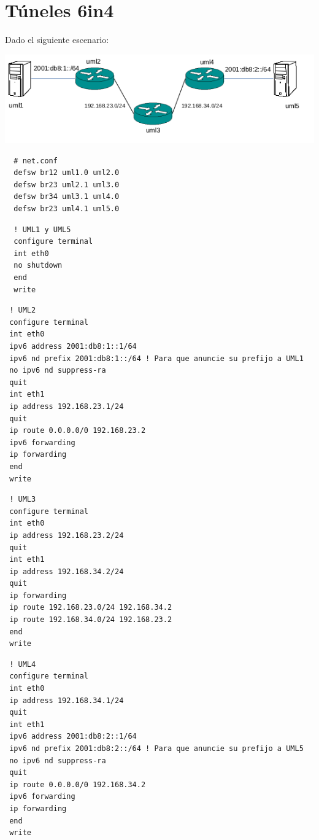 \documentclass{article}
\begin{document}
\tableofcontents

\section{Túneles 6in4}
Dado el siguiente escenario:

\includegraphics[width=\textwidth]{tuneles6in4}

\begin{verbatim}
  # net.conf
  defsw br12 uml1.0 uml2.0
  defsw br23 uml2.1 uml3.0
  defsw br34 uml3.1 uml4.0
  defsw br23 uml4.1 uml5.0
\end{verbatim}

\begin{verbatim}
  ! UML1 y UML5
  configure terminal
  int eth0
  no shutdown
  end
  write
\end{verbatim}

\begin{verbatim}
 ! UML2
 configure terminal
 int eth0
 ipv6 address 2001:db8:1::1/64
 ipv6 nd prefix 2001:db8:1::/64 ! Para que anuncie su prefijo a UML1
 no ipv6 nd suppress-ra
 quit
 int eth1
 ip address 192.168.23.1/24
 quit
 ip route 0.0.0.0/0 192.168.23.2
 ipv6 forwarding
 ip forwarding
 end
 write
\end{verbatim}

\begin{verbatim}
 ! UML3
 configure terminal
 int eth0
 ip address 192.168.23.2/24
 quit
 int eth1
 ip address 192.168.34.2/24
 quit
 ip forwarding
 ip route 192.168.23.0/24 192.168.34.2
 ip route 192.168.34.0/24 192.168.23.2
 end
 write
\end{verbatim}

\begin{verbatim}
 ! UML4
 configure terminal
 int eth0
 ip address 192.168.34.1/24
 quit
 int eth1
 ipv6 address 2001:db8:2::1/64
 ipv6 nd prefix 2001:db8:2::/64 ! Para que anuncie su prefijo a UML5
 no ipv6 nd suppress-ra
 quit
 ip route 0.0.0.0/0 192.168.34.2
 ipv6 forwarding
 ip forwarding
 end
 write
\end{verbatim}
\end{document}
